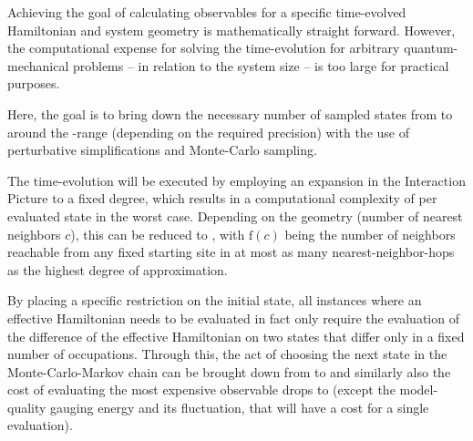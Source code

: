 Achieving the goal of calculating observables for a specific time-evolved Hamiltonian and system geometry is mathematically straight forward.
However, the computational expense for solving the time-evolution for arbitrary quantum-mechanical problems -- in relation to the system size -- is too large for practical purposes.

Here, the goal is to bring down the necessary number of sampled states from  to around the -range (depending on the required precision) with the use of perturbative simplifications and Monte-Carlo sampling. 

The time-evolution will be executed by employing an expansion in the Interaction Picture to a fixed degree, which results in a computational complexity of  per evaluated state in the worst case.
Depending on the geometry (number of nearest neighbors $c$), this can be reduced to , with $\mathrm{f}(c)$ being the number of neighbors reachable from any fixed starting site in at most as many nearest-neighbor-hops as the highest degree of approximation.

By placing a specific restriction on the initial state, all instances where an effective Hamiltonian needs to be evaluated in fact only require the evaluation of the difference of the effective Hamiltonian on two states that differ only in a fixed number of occupations.
Through this, the act of choosing the next state in the Monte-Carlo-Markov chain can be brought down from  to  and similarly also the cost of evaluating the most expensive observable drops to  (except the model-quality gauging energy and its fluctuation, that will have a cost  for a single evaluation).
